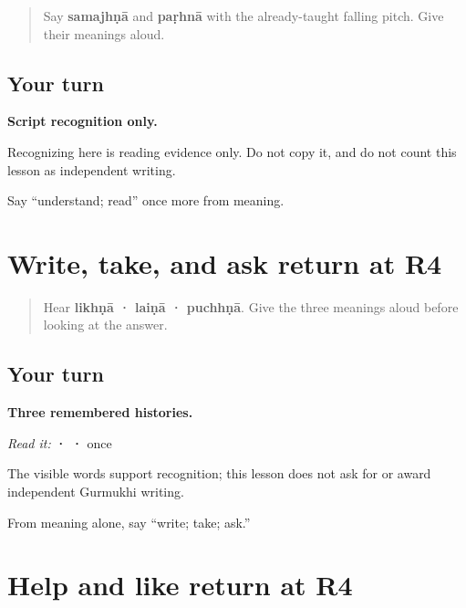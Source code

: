 \label{lesson:PA-R24-understand-read-r4}



\begin{quote}
Say \textbf{samajhṇā} and \textbf{paṛhnā} with the already-taught falling pitch. Give their meanings aloud.
\end{quote}

\subsection*{Your turn}
\textbf{Script recognition only.}

Recognizing \textbf{} here is reading evidence only. Do not copy it, and do not count this lesson as independent writing.

\begin{tcolorbox}[breakable,colback=teal!4,colframe=teal!35!black,title={Before you move on}]
Say “understand; read” once more from meaning.
\end{tcolorbox}
\section[Practice]{Write, take, and ask return at R4}

\label{lesson:PA-R24-write-take-ask-r4}



\begin{quote}
Hear \textbf{likhṇā · laiṇā · puchhṇā}. Give the three meanings aloud before looking at the answer.
\end{quote}

\subsection*{Your turn}
\textbf{Three remembered histories.}

\emph{Read it:} \textbf{ ·  · } once

The visible words support recognition; this lesson does not ask for or award independent Gurmukhi writing.

\begin{tcolorbox}[breakable,colback=teal!4,colframe=teal!35!black,title={Before you move on}]
From meaning alone, say “write; take; ask.”
\end{tcolorbox}
\section[Practice]{Help and like return at R4}

